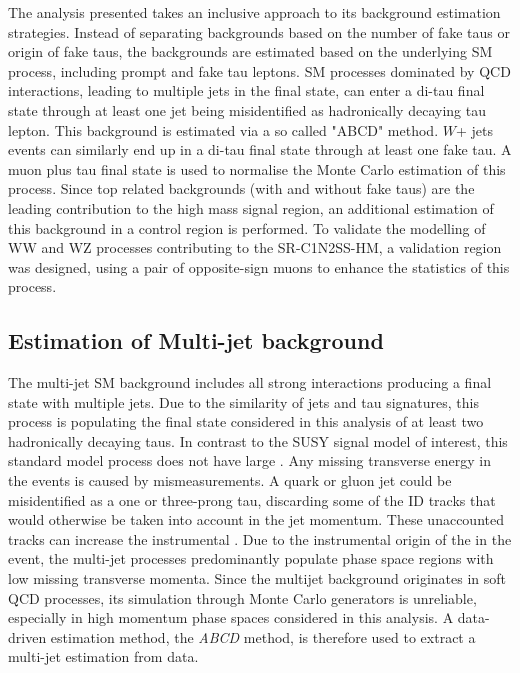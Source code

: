 
The analysis presented takes an inclusive approach to its background estimation strategies. 
Instead of separating backgrounds based on the number of fake taus or origin of fake taus,  the backgrounds are estimated based on the underlying \ac{SM} process,  including prompt and fake tau leptons. 
\ac{SM} processes dominated by QCD interactions, leading to multiple jets in the final state, can enter a di-tau final state through at least one jet being misidentified as hadronically decaying tau lepton. This background is estimated via a so called "ABCD" method. $W$+ jets events can similarly end up in a di-tau final state through at least one fake tau. A muon plus tau final state is used to normalise the Monte Carlo estimation of this process.
Since top related backgrounds (with and without fake taus) are the leading contribution to the high mass signal region, an additional estimation of this background in a control region is performed.
To validate the modelling of WW and WZ processes contributing to the SR-C1N2SS-HM, a validation region was designed, using a pair of opposite-sign muons to enhance the statistics of this process.

\subsection{Estimation of Multi-jet background}
\label{sec:bkgestimation:ABCD}

The multi-jet \ac{SM} background includes all strong interactions producing a final state with multiple jets.  Due to the similarity of jets and tau signatures,  this process is populating the final state considered in this analysis of at least two hadronically decaying taus.  In contrast to the \ac{SUSY} signal model of interest,  this standard model process does not have large \Met. Any missing transverse energy in the events is caused by mismeasurements.  A quark or gluon jet could be misidentified as a one or three-prong tau,  discarding some of the \ac{ID} tracks that would otherwise be taken into account in the jet momentum.  These unaccounted tracks can increase the instrumental \Met. 
Due to the instrumental origin of the \Met in the event,  the multi-jet processes predominantly populate phase space regions with low missing transverse momenta.  
Since the multijet background originates in soft QCD processes,  its simulation through Monte Carlo generators is unreliable,  especially in high momentum phase spaces considered in this analysis. 
A data-driven estimation method,  the \textit{ABCD} method, is therefore used to extract a multi-jet estimation from data. 

